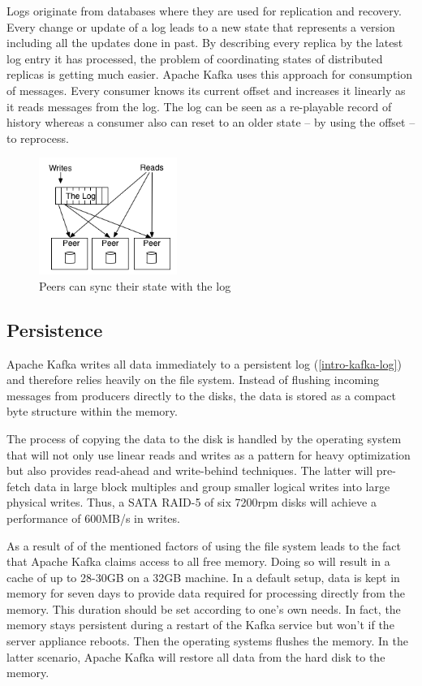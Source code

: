 Logs originate from databases where they are used for replication and
recovery. Every change or update of a log leads to a new state that represents a
version including all the updates done in past. By describing every replica by the
latest log entry it has processed, the problem of coordinating states of
distributed replicas is getting much easier. Apache Kafka uses this approach for
consumption of messages. Every consumer knows its current offset and increases it
linearly as it reads messages from the log. The log can be seen as a re-playable
record of history whereas a consumer also can reset to an older state -- by using
the offset -- to reprocess. \cite{JK-TheLog}

\begin{figure}[H]
    \centering
    \includegraphics[width=0.4\textwidth]{images/state-machine-replication.png}
    \caption{Peers can sync their state with the log \cite{JK-TheLog}}
    \label{fig:the-log}
\end{figure}

\subsection{Persistence}
\label{kafka-persistence}
Apache Kafka writes all data immediately to a persistent log
(\ref{intro-kafka-log}) 
and therefore relies heavily on the file system.
Instead of flushing incoming messages from producers directly to the disks, the
data is stored as a compact byte structure within the memory.

The process of copying the data to the disk is handled by the operating system
that will not only use linear reads and writes as a pattern for heavy
optimization but also provides read-ahead and write-behind techniques.
The latter will pre-fetch data in large block multiples and group smaller logical
writes into large physical writes. Thus, a SATA RAID-5 of six 7200rpm
disks will achieve a performance of 600MB/s in writes.

As a result of of the mentioned factors of using the file system leads to the
fact that Apache Kafka claims access to all free memory. Doing so will result in
a cache of up to 28-30GB on a 32GB machine. In a default setup, data is kept in
memory for seven days to provide data required for processing directly from the
memory. This duration should be set according to one's own needs. In fact, the
memory stays persistent during a restart of the Kafka service but won't if the
server appliance reboots. Then the operating systems flushes the memory. In the
latter scenario, Apache Kafka will restore all data from the hard disk to the
memory. \cite{apachekafka}

